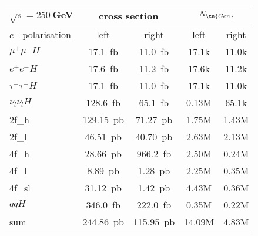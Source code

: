 \begin{tabular}{|l|c|c|c|c|} \hline
    $\sqrt{s} = 250~$GeV & \multicolumn{2}{|c|}{cross section}
                         & \multicolumn{2}{c|}{$N_{\tn{Gen}}$} \\ \hline
$e^-$ polarisation & left & right & left & right \\ \hline
$\mu^+ \mu^- H$ & 17.1~fb& 11.0~fb& 17.1k& 11.0k \\
$e^+ e^- H$ & 17.6~fb& 11.2~fb& 17.6k& 11.2k \\
$\tau^+ \tau^- H$ & 17.1~fb& 11.0~fb& 17.1k& 11.0k \\
$\nu_l \bar{\nu}_l H$ & 128.6~fb& 65.1~fb& 0.13M& 65.1k \\
 \hline
2f\_h & 129.15~pb& 71.27~pb& 1.75M& 1.43M \\
2f\_l & 46.51~pb& 40.70~pb& 2.63M& 2.13M \\
4f\_h & 28.66~pb& 966.2~fb& 2.50M& 0.24M \\
4f\_l & 8.89~pb& 1.28~pb& 2.25M& 0.35M \\
4f\_sl & 31.12~pb& 1.42~pb& 4.43M& 0.36M \\
$q \bar{q} H$ & 346.0~fb& 222.0~fb& 0.35M& 0.22M \\
 \hline \hline
sum & 244.86~pb& 115.95~pb& 14.09M& 4.83M \\
\hline
 \end{tabular}

